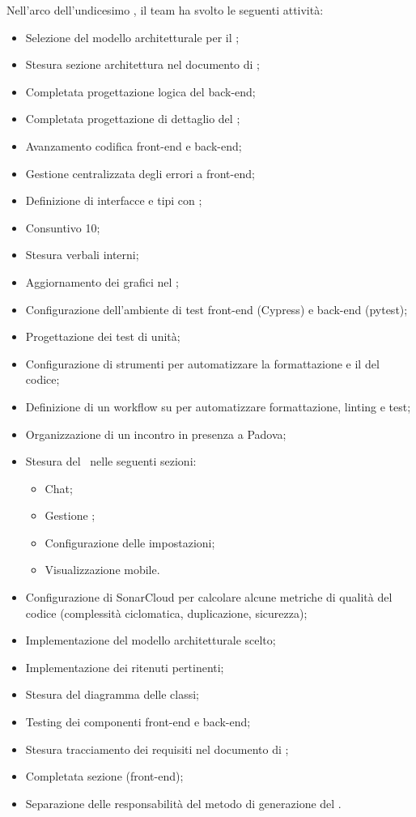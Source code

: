 Nell'arco dell'undicesimo , il team ha svolto le seguenti attività:
\begin{itemize}
  \item Selezione del modello architetturale per il ;
  \item Stesura sezione architettura nel documento di \ST;
  \item Completata progettazione logica del back-end;
  \item Completata progettazione di dettaglio del ;
  \item Avanzamento codifica front-end e back-end;
  \item Gestione centralizzata degli errori a front-end;
  \item Definizione di interfacce e tipi con ;
  \item Consuntivo  10;
  \item Stesura verbali interni;
  \item Aggiornamento dei grafici nel \PdQ;
  \item Configurazione dell'ambiente di test front-end (Cypress) e back-end (pytest);
  \item Progettazione dei test di unità;
  \item Configurazione di strumenti per automatizzare la formattazione e il  del codice;
  \item Definizione di un workflow su  per automatizzare formattazione, linting e test;
  \item Organizzazione di un incontro in presenza a Padova;
  \item Stesura del \MU\ nelle seguenti sezioni:
  \begin{itemize}
    \item Chat;
    \item Gestione ;
    \item Configurazione delle impostazioni;
    \item Visualizzazione mobile.	
  \end{itemize}	
  \item Configurazione di SonarCloud per calcolare alcune metriche di qualità del codice (complessità ciclomatica, duplicazione, sicurezza);
  \item Implementazione del modello architetturale scelto;
  \item Implementazione dei  ritenuti pertinenti;
  \item Stesura del diagramma delle classi;
  \item Testing dei componenti front-end e back-end;
  \item Stesura tracciamento dei requisiti nel documento di \ST;
  \item Completata sezione  (front-end);
  \item Separazione delle responsabilità del metodo di generazione del .
\end{itemize}

